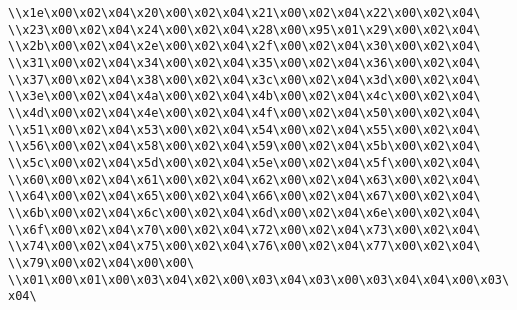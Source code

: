 \verb|\\x1e\x00\x02\x04\x20\x00\x02\x04\x21\x00\x02\x04\x22\x00\x02\x04\|\newline
\verb|\\x23\x00\x02\x04\x24\x00\x02\x04\x28\x00\x95\x01\x29\x00\x02\x04\|\newline
\verb|\\x2b\x00\x02\x04\x2e\x00\x02\x04\x2f\x00\x02\x04\x30\x00\x02\x04\|\newline
\verb|\\x31\x00\x02\x04\x34\x00\x02\x04\x35\x00\x02\x04\x36\x00\x02\x04\|\newline
\verb|\\x37\x00\x02\x04\x38\x00\x02\x04\x3c\x00\x02\x04\x3d\x00\x02\x04\|\newline
\verb|\\x3e\x00\x02\x04\x4a\x00\x02\x04\x4b\x00\x02\x04\x4c\x00\x02\x04\|\newline
\verb|\\x4d\x00\x02\x04\x4e\x00\x02\x04\x4f\x00\x02\x04\x50\x00\x02\x04\|\newline
\verb|\\x51\x00\x02\x04\x53\x00\x02\x04\x54\x00\x02\x04\x55\x00\x02\x04\|\newline
\verb|\\x56\x00\x02\x04\x58\x00\x02\x04\x59\x00\x02\x04\x5b\x00\x02\x04\|\newline
\verb|\\x5c\x00\x02\x04\x5d\x00\x02\x04\x5e\x00\x02\x04\x5f\x00\x02\x04\|\newline
\verb|\\x60\x00\x02\x04\x61\x00\x02\x04\x62\x00\x02\x04\x63\x00\x02\x04\|\newline
\verb|\\x64\x00\x02\x04\x65\x00\x02\x04\x66\x00\x02\x04\x67\x00\x02\x04\|\newline
\verb|\\x6b\x00\x02\x04\x6c\x00\x02\x04\x6d\x00\x02\x04\x6e\x00\x02\x04\|\newline
\verb|\\x6f\x00\x02\x04\x70\x00\x02\x04\x72\x00\x02\x04\x73\x00\x02\x04\|\newline
\verb|\\x74\x00\x02\x04\x75\x00\x02\x04\x76\x00\x02\x04\x77\x00\x02\x04\|\newline
\verb|\\x79\x00\x02\x04\x00\x00\|\newline
\verb|\\x01\x00\x01\x00\x03\x04\x02\x00\x03\x04\x03\x00\x03\x04\x04\x00\x03\x04\|\newline
